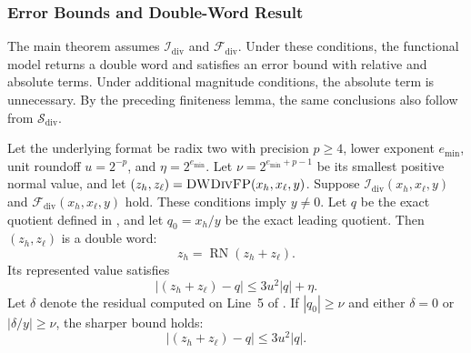 \subsubsection{Error Bounds and Double-Word Result}

The main theorem assumes
$\mathcal{I}_{\mathrm{div}}$ and $\mathcal{F}_{\mathrm{div}}$. Under these
conditions, the functional model returns a double word and satisfies an error
bound with relative and absolute terms. Under additional magnitude conditions,
the absolute term is unnecessary. By the preceding finiteness lemma, the same
conclusions also follow from $\mathcal{S}_{\mathrm{div}}$.

\begin{theorem}
\label{thm:dw-div-fp-numerical}
Let the underlying format be radix two with precision $p\geq4$, lower
exponent $e_{\min}$, unit roundoff $u=2^{-p}$, and
$\eta=2^{e_{\min}}$. Let $\nu=2^{e_{\min}+p-1}$ be its smallest positive
normal value, and let
$(z_h,z_\ell)=\textsc{DWDivFP}{}(x_h,x_\ell,y)$.
Suppose
$\mathcal{I}_{\mathrm{div}}(x_h,x_\ell,y)$ and
$\mathcal{F}_{\mathrm{div}}(x_h,x_\ell,y)$ hold. These conditions imply
$y\neq0$. Let $q$ be the exact quotient defined in
, and let $q_0=x_h/y$ be the exact leading
quotient. Then $(z_h,z_\ell)$ is a double word:
\[
  z_h=\operatorname{RN}(z_h+z_\ell).
\]
Its represented value satisfies
\begin{equation}
  \left|(z_h+z_\ell)-q\right|
    \leq 3u^2|q|+\eta.
  \label{eq:dw-div-fp-mixed}
\end{equation}
Let $\delta$ denote the residual computed on Line~5 of
. If $|q_0|\geq\nu$ and either $\delta=0$ or
$|\delta/y|\geq\nu$, the sharper bound holds:
\begin{equation}
  \left|(z_h+z_\ell)-q\right|
    \leq 3u^2|q|.
  \label{eq:dw-div-fp-relative}
\end{equation}
\end{theorem}

